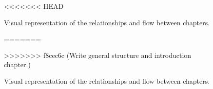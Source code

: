 \begin{figure}[!htbp]
    \newcommand{\imagenode}[3]{ %
            \node (#1) at #2 [label=above:\raisebox{-3em}{{\parbox{4em}{\centering \tiny #3}}}] {\texttt{[image: chapters/\#1/logo/main.pdf]}};
    }
    \begin{center}
    \end{center}
<<<<<<< HEAD
    \caption{Visual representation of the relationships and flow between chapters.}\label{fig:structure}
=======
    \caption{Visual representation of the relationships and flow between chapters.}
    \label{fig:structure}
>>>>>>> f8cec6c (Write general structure and introduction chapter.)
\end{figure}
